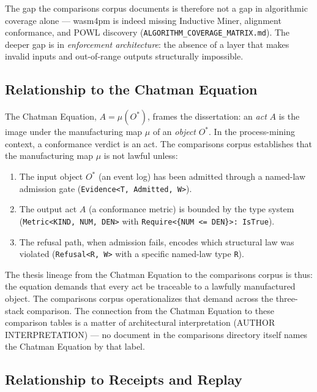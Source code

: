The gap the comparisons corpus documents is therefore not a gap in algorithmic
coverage alone --- wasm4pm is indeed missing Inductive Miner, alignment
conformance, and POWL discovery (\texttt{ALGORITHM\_COVERAGE\_MATRIX.md}). The
deeper gap is in \emph{enforcement architecture}: the absence of a layer that
makes invalid inputs and out-of-range outputs structurally impossible.

\subsection{Relationship to the Chatman Equation}
\label{sec:comparisons-lineage-chatman-eq}

The Chatman Equation, $A = \mu(O^*)$, frames the dissertation: an \emph{act}
$A$ is the image under the manufacturing map $\mu$ of an \emph{object} $O^*$.
In the process-mining context, a conformance verdict is an act. The comparisons
corpus establishes that the manufacturing map $\mu$ is not lawful unless:

\begin{enumerate}
  \item The input object $O^*$ (an event log) has been admitted through a named-law
    admission gate (\texttt{Evidence<T, Admitted, W>}).
  \item The output act $A$ (a conformance metric) is bounded by the type system
    (\texttt{Metric<KIND, NUM, DEN>} with \texttt{Require<\{NUM <= DEN\}>:
    IsTrue}).
  \item The refusal path, when admission fails, encodes which structural law was
    violated (\texttt{Refusal<R, W>} with a specific named-law type \texttt{R}).
\end{enumerate}

The thesis lineage from the Chatman Equation to the comparisons corpus is thus:
the equation demands that every act be traceable to a lawfully manufactured
object. The comparisons corpus operationalizes that demand across the three-stack
comparison. The connection from the Chatman Equation to these comparison tables is
a matter of architectural interpretation (AUTHOR INTERPRETATION) --- no document
in the comparisons directory itself names the Chatman Equation by that label.

\subsection{Relationship to Receipts and Replay}
\label{sec:comparisons-lineage-receipts}


